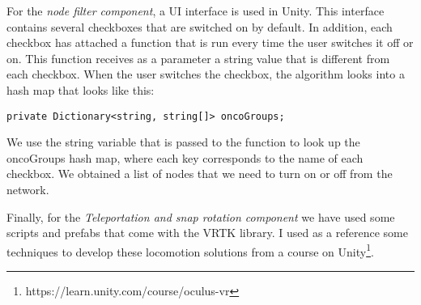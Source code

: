 For the \textit{node filter component}, a UI interface is used in Unity. This interface contains several checkboxes that are switched on by default. In addition, each checkbox has attached a function that is run every time the user switches it off or on. This function receives as a parameter a string value that is different from each checkbox. When the user switches  the checkbox, the algorithm looks into a hash map that looks like this:

\begin{verbatim}
private Dictionary<string, string[]> oncoGroups;
\end{verbatim}

We use the string variable that is passed to the function to look up the oncoGroups hash map, where each key corresponds to the name of each checkbox. We obtained a list of nodes that we need to turn on or off from the network.

Finally, for the \textit{Teleportation and snap rotation component} we have used some scripts and prefabs that come with the VRTK library. I used as a reference some techniques to develop these locomotion solutions from a course on Unity\footnote{https://learn.unity.com/course/oculus-vr}.
